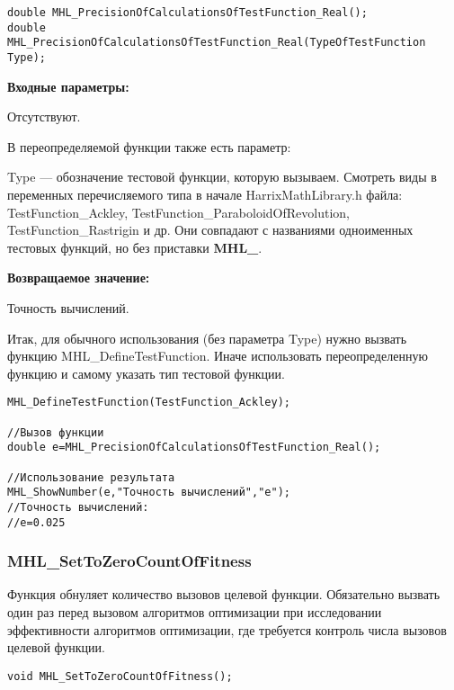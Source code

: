\documentclass[a4paper,12pt]{article}
\begin{document}
\begin{lstlisting}[label=code_syntax_MHL_PrecisionOfCalculationsOfTestFunction_Real,caption=Синтаксис]
double MHL_PrecisionOfCalculationsOfTestFunction_Real();
double MHL_PrecisionOfCalculationsOfTestFunction_Real(TypeOfTestFunction Type);
\end{lstlisting}

\textbf{Входные параметры:}

Отсутствуют.

В переопределяемой функции также есть параметр:
  
Type --- обозначение тестовой функции, которую вызываем.
Смотреть виды в переменных перечисляемого типа в начале HarrixMathLibrary.h файла: TestFunction\_Ackley, TestFunction\_ParaboloidOfRevolution, TestFunction\_Rastrigin и др. Они совпадают с названиями одноименных тестовых функций, но без приставки \textbf{MHL\_}.

\textbf{Возвращаемое значение:}
 
Точность вычислений.

Итак, для обычного использования (без параметра Type) нужно вызвать функцию MHL\_DefineTestFunction. Иначе использовать переопределенную функцию и самому указать тип тестовой функции.


\begin{lstlisting}[label=code_use_MHL_PrecisionOfCalculationsOfTestFunction_Real,caption=Пример использования]
MHL_DefineTestFunction(TestFunction_Ackley);

//Вызов функции
double e=MHL_PrecisionOfCalculationsOfTestFunction_Real();

//Использование результата
MHL_ShowNumber(e,"Точность вычислений","e");
//Точность вычислений:
//e=0.025
\end{lstlisting}

\subsubsection{MHL\_SetToZeroCountOfFitness}\label{MHL_SetToZeroCountOfFitness}

Функция обнуляет количество вызовов целевой функции. Обязательно вызвать один раз перед вызовом алгоритмов оптимизации при исследовании эффективности    алгоритмов оптимизации, где требуется контроль числа вызовов целевой функции.


\begin{lstlisting}[label=code_syntax_MHL_SetToZeroCountOfFitness,caption=Синтаксис]
void MHL_SetToZeroCountOfFitness();
\end{lstlisting}
\end{document}
